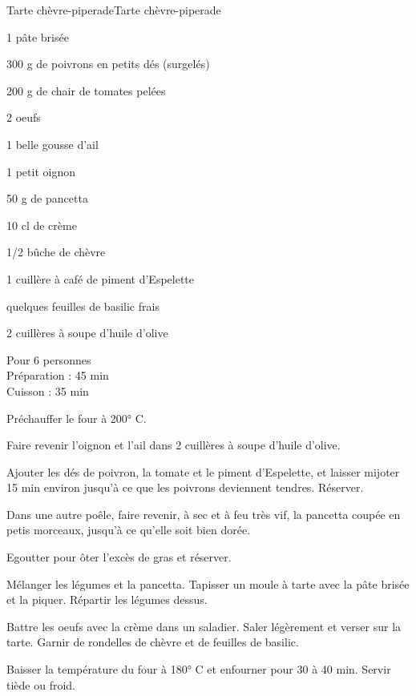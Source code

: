 \begin{recette}{Tarte chèvre-piperade}{Tarte chèvre-piperade}

\begin{ingredients}
1 pâte brisée\par
300 g de poivrons en petits dés (surgelés)\par
200 g de chair de tomates pelées\par
2 oeufs\par
1 belle gousse d'ail\par
1 petit oignon\par
50 g de pancetta\par
10 cl de crème\par
1/2 bûche de chèvre\par
1 cuillère à café de piment d'Espelette\par
quelques feuilles de basilic frais\par
2 cuillères à soupe d'huile d'olive\par
\end{ingredients}

\begin{infos}
Pour 6 personnes\\
Préparation : 45 min\\
Cuisson : 35 min\\
\end{infos}

\begin{etapes}
\item Préchauffer le four à 200° C.
\item Faire revenir l'oignon et l'ail dans 2 cuillères à soupe d'huile d'olive.
\item Ajouter les dés de poivron, la tomate et le piment d'Espelette, et laisser mijoter 15 min environ jusqu'à ce que les poivrons deviennent tendres. Réserver.
\item Dans une autre poêle, faire revenir, à sec et à feu très vif, la pancetta coupée en petis morceaux, jusqu'à ce qu'elle soit bien dorée.
\item Egoutter pour ôter l'excès de gras et réserver.
\item Mélanger les légumes et la pancetta. Tapisser un moule à tarte avec la pâte brisée et la piquer. Répartir les légumes dessus.
\item Battre les oeufs avec la crème dans un saladier. Saler légèrement et verser sur la tarte. Garnir de rondelles de chèvre et de feuilles de basilic.
\item Baisser la température du four à 180° C et enfourner pour 30 à 40 min. Servir tiède ou froid.
\end{etapes}

\end{recette}